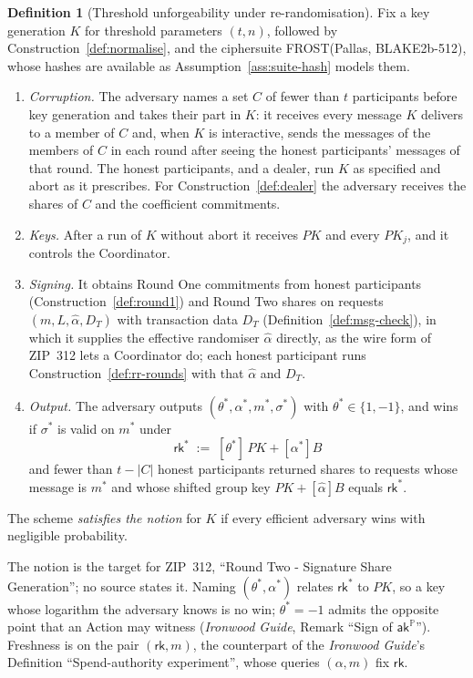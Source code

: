 \documentclass[11pt,a4paper]{article}
\theoremstyle{definition}
\newtheorem{definition}[theorem]{Definition}
\newcommand{\PP}{\mathbb{P}}
\newcommand{\rk}{\mathsf{rk}}
\newcommand{\aksym}{\ensuremath{\mathsf{ak}}}
\begin{document}
\begin{definition}[Threshold unforgeability under re-randomisation]
\label{def:ts-ruf}
Fix a key generation \(K\) for threshold parameters \((t, n)\), followed by
Construction~\ref{def:normalise}, and the ciphersuite
FROST(Pallas, BLAKE2b-512), whose hashes are available as
Assumption~\ref{ass:suite-hash} models them.
\begin{enumerate}
\item \emph{Corruption.} The adversary names a set \(C\) of fewer than
  \(t\) participants before key generation and takes their part in \(K\):
  it receives every message \(K\) delivers to a member of \(C\) and, when
  \(K\) is interactive, sends the messages of the members of \(C\) in each
  round after seeing the honest participants' messages of that round. The
  honest participants, and a dealer, run \(K\) as specified and abort as it
  prescribes. For Construction~\ref{def:dealer} the adversary receives the
  shares of \(C\) and the coefficient commitments.
\item \emph{Keys.} After a run of \(K\) without abort it receives
  \(\mathit{PK}\) and every \(\mathit{PK}_j\), and it controls the
  Coordinator.
\item \emph{Signing.} It obtains Round One commitments from honest
  participants (Construction~\ref{def:round1}) and Round Two shares on
  requests \((m, L, \hat{\alpha}, D_T)\) with transaction data \(D_T\)
  (Definition~\ref{def:msg-check}), in which it supplies the effective
  randomiser \(\hat{\alpha}\) directly, as the wire form of ZIP~312 lets a
  Coordinator do; each honest participant runs
  Construction~\ref{def:rr-rounds} with that \(\hat{\alpha}\) and
  \(D_T\).
\item \emph{Output.} The adversary outputs \((\theta^{*}, \alpha^{*}, m^{*},
  \sigma^{*})\) with \(\theta^{*} \in \{1, -1\}\), and wins if
  \(\sigma^{*}\) is valid on \(m^{*}\) under
  \[
    \rk^{*} \;:=\; [\theta^{*}]\,\mathit{PK} + [\alpha^{*}]B
  \]
  and fewer than \(t - \lvert C \rvert\) honest participants returned shares
  to requests whose message is \(m^{*}\) and whose shifted group key
  \(\mathit{PK} + [\hat{\alpha}]B\) equals \(\rk^{*}\).
\end{enumerate}
The scheme \emph{satisfies the notion} for \(K\) if every efficient
adversary wins with negligible probability.
\end{definition}

The notion is the target for ZIP~312, ``Round Two - Signature Share
Generation''; no source states it. Naming \((\theta^{*}, \alpha^{*})\)
relates \(\rk^{*}\) to \(\mathit{PK}\), so a key whose logarithm the
adversary knows is no win; \(\theta^{*} = -1\) admits the opposite point
that an Action may witness (\emph{Ironwood Guide}, Remark ``Sign of
\(\aksym^{\PP}\)''). Freshness is on the pair \((\rk, m)\), the counterpart
of the \emph{Ironwood Guide}'s Definition ``Spend-authority experiment'',
whose queries \((\alpha, m)\) fix \(\rk\).
\end{document}
